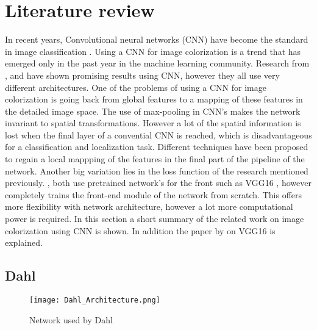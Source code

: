 \section{Literature review}
 
In recent years, Convolutional neural networks (CNN) have become the standard in image
classification \cite{Krizhevsky}. Using a CNN for image colorization is a trend that has emerged only in the past year in the machine learning community. Research from \cite{Dahl}, \cite{Zhang}
and \cite{Cheng} have shown promising results using CNN, however they all use very different
architectures. One of the problems of using a CNN for image colorization is going back from global features to a mapping of these features in the detailed image space. The use of max-pooling in CNN's makes the network invariant to spatial transformations. However a lot of the spatial information is lost when the final layer of a convential CNN is reached, which is disadvantageous for a classification and localization task. Different techniques have been proposed to regain a local mappping of the features in the final part of the pipeline of the network. Another big variation lies in the loss function of the research mentioned previously. \cite{Dahl}, \cite{Zhang} both use pretrained network's for the front such as VGG16 \cite{Simonyan}, however \cite{Cheng} completely trains the front-end module of the network from scratch. This offers more flexibility with network architecture, however a lot more computational power is required. In
this section a short summary of the related work on image colorization using CNN is shown. In addition the paper by \cite{Simonyan} on VGG16 is explained.

\subsection{Dahl}

\begin{wrapfigure}{r}{0.50\textwidth}
	\vspace{5pt}
	\begin{center}
		\texttt{[image: Dahl\_Architecture.png]}
	\end{center}
	\caption{Network used by Dahl \cite{Dahl}}
	\label{fig:dahlnetwork}
	\vspace{5pt}
\end{wrapfigure}

